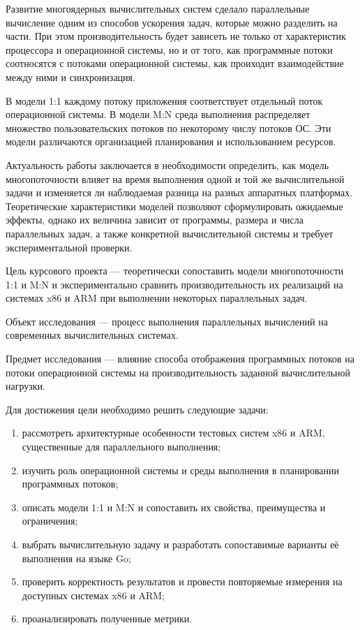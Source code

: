 Развитие многоядерных вычислительных систем сделало параллельные вычисление одним из способов
  ускорения задач, которые можно разделить на части. При этом производительность будет зависеть не
  только от характеристик процессора и операционной системы, но и от того, как программные потоки
  соотносятся с потоками операционной системы, как проиходит взаимодействие между ними и
  синхронизация.

В модели 1:1 каждому потоку приложения соответствует отдельный поток операционной системы. В модели
  M:N среда выполнения распределяет множество пользовательских потоков по некоторому числу потоков
  ОС. Эти модели различаются организацией планирования и использованием ресурсов.

Актуальность работы заключается в необходимости определить, как модель многопоточности влияет на
  время выполнения одной и той же вычислительной задачи и изменяется ли наблюдаемая разница на
  разных аппаратных платформах. Теоретические характеристики моделей позволяют сформулировать
  ожидаемые эффекты, однако их величина зависит от программы, размера и числа параллельных задач,
  а также конкретной вычислительной системы и требует экспериментальной проверки.

Цель курсового проекта — теоретически сопоставить модели многопоточности 1:1 и M:N и
  экспериментально сравнить производительность их реализаций на системах x86 и ARM при выполнении
  некоторых параллельных задач.

Объект исследования — процесс выполнения параллельных вычислений на современных
  вычислительных системах.

Предмет исследования — влияние способа отображения программных потоков на потоки
  операционной системы на производительность заданной вычислительной нагрузки.

Для достижения цели необходимо решить следующие задачи:

\begin{enumerate}
  \item рассмотреть архитектурные особенности тестовых систем x86 и ARM, существенные для
    параллельного выполнения;
  \item изучить роль операционной системы и среды выполнения в планировании программных потоков;
  \item описать модели 1:1 и M:N и сопоставить их свойства, преимущества и ограничения;
  \item выбрать вычислительную задачу и разработать сопоставимые варианты её выполнения на языке Go;
  \item проверить корректность результатов и провести повторяемые измерения на доступных системах x86 и ARM;
  \item проанализировать полученные метрики.
\end{enumerate}

